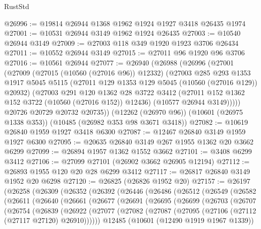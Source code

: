 \begin{lexlean}{RustStd}
\begin{coremodule}
@26996 := @19814 @26944 @1368 @1962 @1924 @1927 @3418 @26435 @1974
@27001 := @10531 @26944 @3149 @1962 @1924 @26435
@27003 := @10540 @26944 @3149
@27009 := @27003 @118 @349 @1920 @1923 @3706 @26434
@27011 := @10552 @26944 @3149
@27015 := @27011 @96 @1920 @96 @3706
@27016 := @10561 @26944
@27077 := @26940
    (@26988
      (@26996
        (@27001
          (@27009
            (@27015 (@10560 (@27016 @96)) @12332)
            (@27003
              @285
              @293
              @1353
              @1917
              @5045
              @5115
              (@27011 @129 @1353 @129 @5045 (@10560 (@27016 @129)) @20932)
              (@27003
                @291
                @120
                @1362
                @28
                @3722
                @3412
                (@27011 @152 @1362 @152 @3722 (@10560 (@27016 @152)) @12436)
                (@10577 @26944 @3149)))))
        @20726
        @20729
        @20732
        @20735))
    (@12262 (@26970 @96))
    (@10601 (@26975 @1338 @353))
    (@10485 (@26982 @353 @98 @3671 @3418))
@27082 := @10619 @26840 @1959 @1927 @3418 @6300
@27087 := @12467 @26840 @3149 @1959 @1927 @6300
@27095 := @20635 @26840 @3149 @267 @1955 @1362 @20 @3662 @6299
@27099 := @26894 @1957 @1362 @1552 @3662
@27101 := @3408 @6299 @3412
@27106 := @27099 @27101 (@26902 @3662 @26905 @12194)
@27112 := @26893 @1955 @120 @20 @28 @6299 @3412
@27117 := @26817 @26840 @3149 @1952 @20 @6298
@27120 := @26825 (@26826 @1952 @20)
@27157 := @26197
    (@26258
      (@26309
        (@26352
          (@26392
            (@26446
              (@26486
                (@26512
                  (@26549
                    (@26582
                      (@26611
                        (@26640
                          (@26661
                            (@26677
                              (@26691
                                (@26695
                                  (@26699
                                    (@26703
                                      (@26707
                                        (@26754
                                          (@26839
                                            (@26922
                                              (@27077
                                                (@27082
                                                  (@27087
                                                    (@27095
                                                      (@27106 (@27112 (@27117 @27120) @26910))))))
                                              @12485
                                              (@10601 (@12490 @1919 @1967 @1339))

\end{coremodule}
\end{lexlean}
